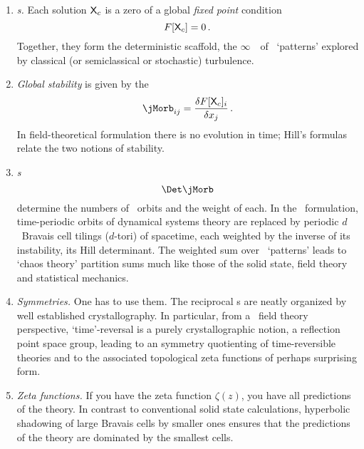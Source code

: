 \begin{enumerate}
              \item
\emph{{\Lattstate}s.} Each solution $\mathsf{X}_c$ is a zero of
a global {\em fixed point} condition
\[
F[\mathsf{X}_c] = 0
\,.
\]
Together, they form the deterministic scaffold, the $\infty$\dmn\
\statesp\ of  \spt\ `patterns' explored by classical (or
semiclassical or stochastic) turbulence.
              \item
{\em Global stability} is given by the {\jacobianOrb}
\[
\jMorb_{ij} =\frac{\delta F[\Xx_c]_i}{\delta \ssp_j}
\,.
\]
In
field-theoretical formulation there is no evolution in time; Hill's
formulas relate the two notions of stability.
              \item
{\em {\HillDet}s} \[
\Det\jMorb
\]
determine the numbers of \spt\ orbits and the weight of each. In the
\spt\ formulation, time-periodic orbits of dynamical systems theory are
replaced by periodic $d$\dmn\ {Bravais cell} tilings ($d$-tori) of
spacetime, each weighted by the inverse of its instability, its Hill
determinant.
The weighted sum over \spt\ `patterns' leads to `chaos theory' partition
sums much like those of  the solid state, field theory and statistical
mechanics.

              \item
{\em Symmetries.} One has to use them. The reciprocal {\lattstate}s are
neatly organized by well established crystallography. In particular, from
a \spt\ field theory perspective, `time'-reversal is a purely
crystallographic notion, a reflection point space group, leading to an
symmetry quotienting of time-reversible theories and to the associated
topological zeta functions of perhaps surprising form.

              \item
{\em Zeta functions.}
If you have the zeta function $\zeta(z)$,
you have all predictions of the theory.
In contrast to conventional solid state calculations, hyperbolic
shadowing of large Bravais cells by smaller ones
ensures that the predictions of the theory are dominated by the smallest
cells.
            \end{enumerate}
